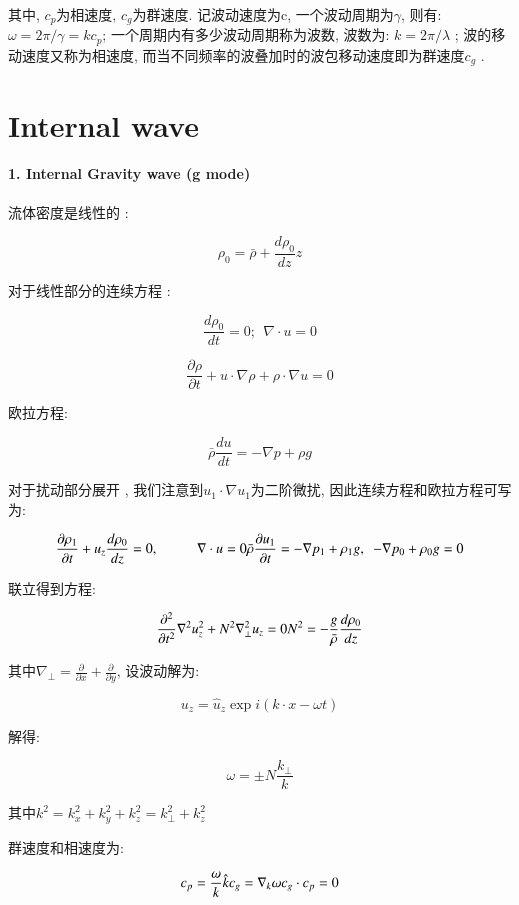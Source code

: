 \documentclass[fontset=windows]{report}
\begin{document}
其中, \(c_p\)为相速度, \(c_g\)为群速度. 记波动速度为c,
一个波动周期为\(\gamma\), 则有: \(\omega=2\pi/\gamma=kc_p\);
一个周期内有多少波动周期称为波数, 波数为: \(k=2\pi/\lambda\) ;
波的移动速度又称为相速度,
而当不同频率的波叠加时的波包移动速度即为群速度\(c_g\) .


\section{Internal wave}

\hypertarget{1-internal-gravity-wave-g-mode}{%
\paragraph{1. Internal Gravity wave (g
mode)}\label{1-internal-gravity-wave-g-mode}}

流体密度是线性的 :

\[\rho_0=\bar \rho +\frac{d\rho_0}{dz}z\]

对于线性部分的连续方程 :

\[\frac{d\rho_0}{dt}=0;\ \ 
\nabla\cdot u = 0\]

\[\frac{\partial \rho}{\partial t}+u\cdot \nabla\rho+\rho\cdot\nabla u=0\]

欧拉方程:

\[\bar \rho\frac{du}{dt}=-\nabla p +\rho g\]

对于扰动部分展开 , 我们注意到\(u_1\cdot\nabla u_1\)为二阶微扰,
因此连续方程和欧拉方程可写为:

\[\frac{\partial \rho_1}{\partial t}+u_z\frac{d\rho_0}{dz}=0 ,
\ \ \ \ \ \ \ \ \ \ \ \nabla\cdot u=0\\
\bar \rho \frac{\partial u_1}{\partial t}=-\nabla p_1+\rho_1 g,
\ \ -\nabla p_0+\rho_0 g=0\]

联立得到方程:

\[\frac{\partial^2}{\partial t^2}\nabla^2u_z^2+N^2\nabla^2_{\perp}u_z=0\\
N^2=-\frac{g}{\bar \rho}\frac{d\rho_0}{dz}\]

其中\(\nabla_{\perp}=\frac{\partial}{\partial x}+\frac{\partial}{\partial y}\),
设波动解为:

\[u_z=\hat u_z\exp i(k\cdot x-\omega t)\]

解得:

\[\omega = \pm N\frac{k_\perp}{k}\]

其中\(k^2=k_x^2+k_y^2+k_z^2=k_{\perp}^2+k_z^2\)

群速度和相速度为:

\[c_p = \frac \omega k \hat k\\
c_g=\nabla_k \omega\\
c_g\cdot c_p=0\]
\end{document}
